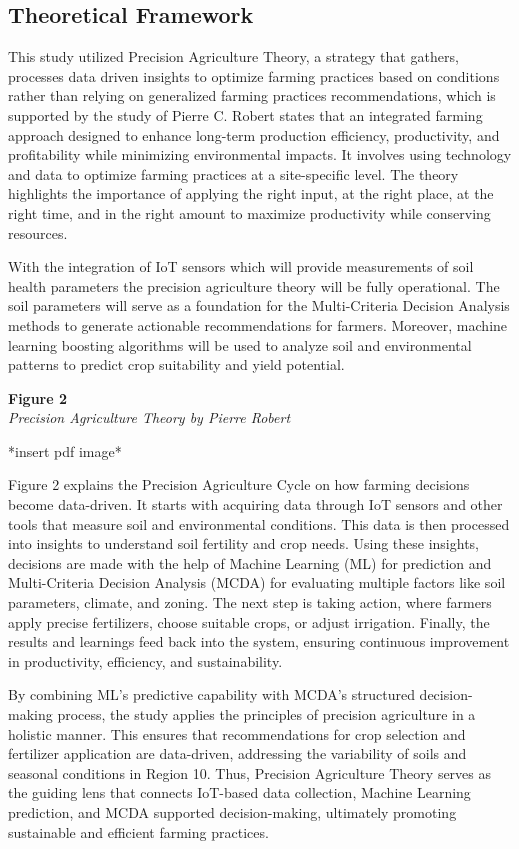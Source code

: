 \begin{doublespace}
\subsection{Theoretical Framework}

This study utilized Precision Agriculture Theory, a strategy that gathers, processes data driven insights to optimize farming practices based on conditions rather than relying on generalized farming practices recommendations, which is supported by the study of Pierre C. Robert states that an integrated farming approach designed to enhance long-term production efficiency, productivity, and profitability while minimizing environmental impacts. It involves using technology and data to optimize farming practices at a site-specific level. The theory highlights the importance of applying the right input, at the right place, at the right time, and in the right amount to maximize productivity while conserving resources. 

With the integration of IoT sensors which will provide measurements of soil health parameters the precision agriculture theory will be fully operational. The soil parameters will serve as a foundation for the Multi-Criteria Decision Analysis methods to generate actionable recommendations for farmers. Moreover, machine learning boosting algorithms will be used to analyze soil and environmental patterns to predict crop suitability and yield potential. 

\textbf{Figure 2}\\
\textit{Precision Agriculture Theory by Pierre Robert}

*insert pdf image*

Figure 2 explains the Precision Agriculture Cycle on how farming decisions become data-driven. It starts with acquiring data through IoT sensors and other tools that measure soil and environmental conditions. This data is then processed into insights to understand soil fertility and crop needs. Using these insights, decisions are made with the help of Machine Learning (ML) for prediction and Multi-Criteria Decision Analysis (MCDA) for evaluating multiple factors like soil parameters, climate, and zoning. The next step is taking action, where farmers apply precise fertilizers, choose suitable crops, or adjust irrigation. Finally, the results and learnings feed back into the system, ensuring continuous improvement in productivity, efficiency, and sustainability.

By combining ML’s predictive capability with MCDA’s structured decision-making process, the study applies the principles of precision agriculture in a holistic manner. This ensures that recommendations for crop selection and fertilizer application are data-driven, addressing the variability of soils and seasonal conditions in Region 10. Thus, Precision Agriculture Theory serves as the guiding lens that connects IoT-based data collection, Machine Learning prediction, and MCDA supported decision-making, ultimately promoting sustainable and efficient farming practices.


\end{doublespace}
